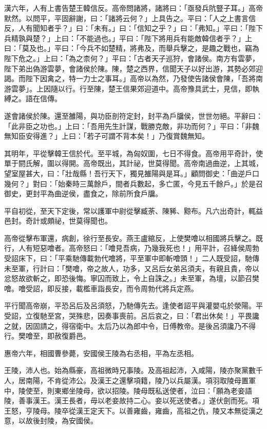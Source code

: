 \begin{pinyinscope}
漢六年，人有上書告楚王韓信反。高帝問諸將，諸將曰：「亟發兵阬豎子耳。」高帝默然。以問平，平固辭謝，曰：「諸將云何？」上具告之。平曰：「人之上書言信反，人有聞知者乎？」曰：「未有。」曰：「信知之乎？」曰：「弗知。」平曰：「陛下兵精孰與楚？」上曰：「不能過也。」平曰：「陛下將用兵有能敵韓信者乎？」上曰：「莫及也。」平曰：「今兵不如楚精，將弗及，而舉兵擊之，是趣之戰也，竊為陛下危之。」上曰：「為之柰何？」平曰：「古者天子巡狩，會諸侯。南方有雲夢，陛下弟出偽游雲夢，會諸侯於陳。陳，楚之西界，信聞天子以好出游，其勢必郊迎謁。而陛下因禽之，特一力士之事耳。」高帝以為然，乃發使告諸侯會陳，「吾將南游雲夢」。上因隨以行。行至陳，楚王信果郊迎道中。高帝豫具武士，見信，即執縛之。語在信傳。

遂會諸侯於陳。還至雒陽，與功臣剖符定封，封平為戶牖侯，世世勿絕。平辭曰：「此非臣之功也。」上曰：「吾用先生計謀，戰勝克敵，非功而何？」平曰：「非魏無知臣安得進？」上曰：「若子可謂不背本矣！」乃復賞魏無知。

其明年，平從擊韓王信於代。至平城，為匈奴圍，七日不得食。高帝用平奇計，使單于閼氏解，圍以得開。高帝既出，其計祕，世莫得聞。高帝南過曲逆，上其城，望室屋甚大，曰：「壯哉縣！吾行天下，獨見雒陽與是耳。」顧問御史：「曲逆戶口幾何？」對曰：「始秦時三萬餘戶，間者兵數起，多亡匿，今見五千餘戶。」於是召御史，更封平為曲逆侯，盡食之，除前所食戶牖。

平自初從，至天下定後，常以護軍中尉從擊臧荼、陳豨、黥布。凡六出奇計，輒益邑封。奇計或頗祕，世莫得聞也。

高帝從擊布軍還，病創，徐行至長安。燕王盧綰反，上使樊噲以相國將兵擊之。既行，人有短惡噲者。高帝怒曰：「噲見吾病，乃幾我死也！」用平計，召絳侯周勃受詔床下，曰：「平乘馳傳載勃代噲將，平至軍中即斬噲頭！」二人既受詔，馳傳未至軍，行計曰：「樊噲，帝之故人，功多，又呂后女弟呂須夫，有親且貴，帝以忿怒故欲斬之，即恐後悔。寧囚而致上，令上自誅之。」未至軍，為壇，以節召樊噲。噲受詔，即反接，載檻車詣長安，而令周勃代將兵定燕。

平行聞高帝崩，平恐呂后及呂須怒，乃馳傳先去。逢使者詔平與灌嬰屯於滎陽。平受詔，立復馳至宮，哭殊悲，因奏事喪前。呂后哀之，曰：「君出休矣！」平畏讒之就，因固請之，得宿衛中。太后乃以為郎中令，日傅教帝。是後呂須讒乃不得行。樊噲至，即赦復爵邑。

惠帝六年，相國曹參薨，安國侯王陵為右丞相，平為左丞相。

王陵，沛人也。始為縣豪，高祖微時兄事陵。及高祖起沛，入咸陽，陵亦聚黨數千人，居南陽，不肯從沛公。及漢王之還擊項籍，陵乃以兵屬漢。項羽取陵母置軍中，陵使至，則東鄉坐陵母，欲以招陵。陵母既私送使者，泣曰：「願為老妾語陵，善事漢王。漢王長者，毋以老妾故持二心。妾以死送使者。」遂伏劍而死。項王怒，亨陵母。陵卒從漢王定天下。以善雍齒，雍齒，高祖之仇，陵又本無從漢之意，以故後封陵，為安國侯。


\end{pinyinscope}
